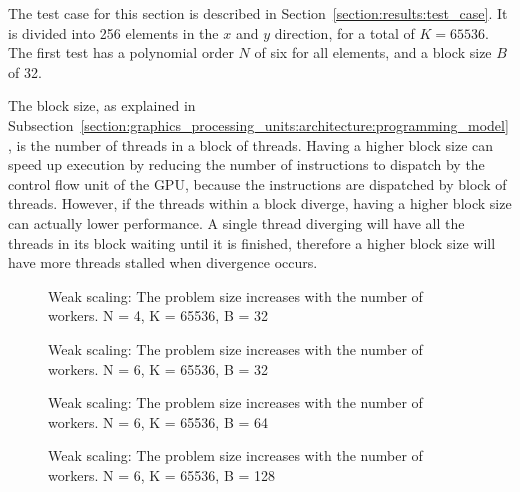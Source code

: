 The test case for this section is described in Section~\ref{section:results:test_case}. It is
divided into 256 elements in the $x$ and $y$ direction, for a total of $K = 65536$. The first test
has a polynomial order $N$ of six for all elements, and a block size $B$ of 32. 

The block size, as explained in
Subsection~\ref{section:graphics_processing_units:architecture:programming_model}, is the number of
threads in a block of threads. Having a higher block size can speed up execution by reducing the
number of instructions to dispatch by the control flow unit of the GPU, because the instructions are
dispatched by block of threads. However, if the threads within a block diverge, having a higher
block size can actually lower performance. A single thread diverging will have all the threads in
its block waiting until it is finished, therefore a higher block size will have more threads stalled
when divergence occurs.



\begin{figure}[H]
	\centering
	
	\caption{Weak scaling: The problem size increases with the number of workers. N = 4, K = 65536, B = 32}
	\label{fig:strong_scaling_N4_W32}
\end{figure}



\begin{figure}[H]
	\centering
	
	\caption{Weak scaling: The problem size increases with the number of workers. N = 6, K = 65536, B = 32}
	\label{fig:strong_scaling_N6_W32}
\end{figure}

\begin{figure}[H]
	\centering
	
	\caption{Weak scaling: The problem size increases with the number of workers. N = 6, K = 65536, B = 64}
	\label{fig:strong_scaling_N6_W64}
\end{figure}

\begin{figure}[H]
	\centering
	
	\caption{Weak scaling: The problem size increases with the number of workers. N = 6, K = 65536, B = 128}
	\label{fig:strong_scaling_N6_W128}
\end{figure}

